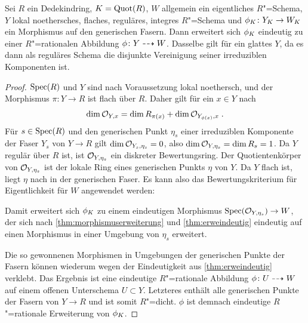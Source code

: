 \begin{Lemma}\label{thm:erwrrational}
  Sei $R$ ein Dedekindring, $K=\operatorname{Quot}(R)$, $W$ allgemein ein
  eigentliches $R$"=Schema, $Y$ lokal noethersches, flaches, reguläres,
  integres
  $R$"=Schema und ${\phi_{K}\colon Y_{K}\to W_{K}}$ ein Morphismus auf den
  generischen Fasern.
  Dann erweitert sich $\phi_{K}$ eindeutig zu einer
  $R$"=rationalen Abbildung ${\phi\colon Y\dashrightarrow W}$.
  Dasselbe gilt für ein glattes $Y$, da es dann als reguläres Schema
  die disjunkte Vereinigung seiner irreduziblen Komponenten ist.
  \begin{proof}
    $\operatorname{Spec}(R)$ und $Y$ sind nach Voraussetzung lokal noethersch,
    und der Morphismus ${\pi\colon Y\to R}$ ist flach über $R$. Daher
    gilt für ein $x\in Y$ nach \cite[Theorem~4.3.12]{liu}
    \begin{gather}\label{eq:stalkdimension}
      \dim\mathcal{O}_{Y,x} = \dim R_{\pi(x)} + \dim\mathcal{O}_{Y_{\phi(x)}, x}\;.
    \end{gather}
    Für $s\in\operatorname{Spec}(R)$ und den generischen Punkt $\eta_{s}$ einer
    irreduziblen Komponente der Faser $Y_s$ von $Y\to R$ gilt
    $\dim\mathcal{O}_{Y_s, \eta_{s}}=0$, also $\dim\mathcal{O}_{Y,\eta_{s}}=\dim R_s=1$.
    Da $Y$ regulär über $R$ ist, ist $\mathcal{O}_{Y,\eta_{s}}$ ein diskreter
    Bewertungsring.
    Der Quotientenkörper von $\mathcal{O}_{Y,\eta_{s}}$ ist der lokale Ring
    eines generischen Punkts $\eta$ von $Y$. Da $Y$ flach
    ist, liegt $\eta$ nach \cite[Proposition~III.9.7]{hartshorne} in
    der generischen Faser.
    Es kann also das Bewertungskriterium für Eigentlichkeit für $W$
    angewendet werden:
    \begin{center}
    \end{center}
    Damit erweitert sich $\phi_{K}$ zu einem eindeutigen Morphismus
    ${\operatorname{Spec}(\mathcal{O}_{Y,\eta_{s}})\to W}$, der sich nach
    \ref{thm:morphismuserweiterung} und \ref{thm:erweindeutig}
    eindeutig auf einen Morphismus in einer Umgebung von $\eta_{s}$
    erweitert.
    
    Die so gewonnenen Morphismen in Umgebungen der generischen Punkte
    der Fasern können wiederum wegen der Eindeutigkeit aus
    \ref{thm:erweindeutig} verklebt. Das Ergebnis ist eine eindeutige
    $R$"=rationale Abbildung $\phi\colon U\dashrightarrow W$ auf einem offenen
    Unterschema $U\subset Y$.
    Letzteres enthält alle generischen Punkte der Fasern von $Y\to R$
    und ist somit $R$"=dicht.
    $\phi$ ist demnach eindeutige $R$"=rationale Erweiterung von
    $\phi_{K}$.
  \end{proof}
\end{Lemma}

